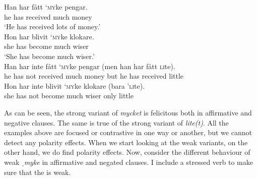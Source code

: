 \documentclass[output=paper]{langscibook}
\begin{document}
\ea
\gll Han    har    fått         ‘\textsc{my}ke   pengar.\\
he           has       received   much     money\\
\glt `He has received lots of money.’\\
\ex
\gll Hon  har   blivit     ‘\textsc{my}ke   klokare.\\
she         has    become  much    wiser\\
\glt `She has become much wiser.’\\
\ex
\gll Han  har     inte     fått       ‘\textsc{my}ke   pengar (men   han     har   fått \textsc{li}te).\\
he       has       not     received  much     money   but   he   has   received   little\\
\ex
\gll Hon    har     inte     blivit     ‘\textsc{my}ke     klokare   (bara     ’\textsc{li}te).\\
she             has       not     become     much   wiser     only     little\\
\z


As can be seen, the strong variant of \textit{mycket} is felicitous both in affirmative and negative clauses. The same is true of the strong variant of \textit{lite(t)}. All the examples above are focused or contrastive in one way or another, but we cannot detect any polarity effects. When we start looking at the weak variants, on the other hand, we do find polarity effects. Now, consider the different behaviour of weak \textit{ˌmyke} in affirmative and negated clauses. I include a stressed verb to make sure that the  is weak.

{\judgewidth{\#}
\z}
\end{document}
